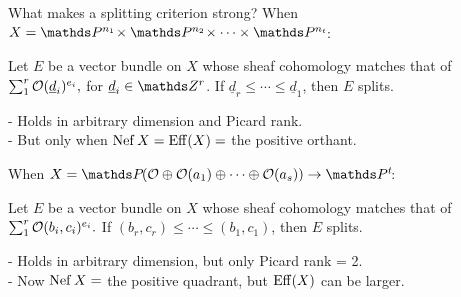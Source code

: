 \documentclass[beamer]{paper}
\begin{document}




\begin{frame}[t]{What makes a splitting criterion strong?}
  When $X = \PP{n_1}\times\PP{n_2}\times\cdots\times\PP{n_t}$:
  \begin{theorem}
    Let $E$ be a vector bundle on $X$ whose sheaf cohomology matches that of
    \( \sum_1^r \mathcal{O}(\underline{d}_i)^{e_i}, \) for $\underline{d}_i\in\ZZ^r$.
    {\color{rossred}If $\underline{d}_r \le \cdots \le \underline{d}_1$}, then $E$ splits.
  \end{theorem}
  \pause
  - Holds in arbitrary dimension and Picard rank. \\
  - But {\color{rossred}only when $\operatorname{Nef}X = \operatorname{Eff}(X) = $ the positive orthant}.

  \vfill
  \pause
  When $X = \PP{}(\o\oplus\o(a_1)\oplus\cdots\oplus\o(a_s)) \to \PP{t}$:
  \pause
  \begin{theorem}[Brown--S. '22]
    Let $E$ be a vector bundle on $X$ whose sheaf cohomology matches that of
    \( \sum_1^r \mathcal{O}(b_i, c_i)^{e_i}. \)
    {\color{rossred}If $(b_r, c_r) \le \cdots \le(b_1, c_1)$}, then $E$ splits.
  \end{theorem}
  \pause
  - Holds in arbitrary dimension, but {\color{rossred}only Picard rank = 2}. \\
  - Now $\operatorname{Nef}X = $ the positive quadrant, but {\color{rossgreen}$\operatorname{Eff}(X)$ can be larger}.
\end{frame}
\end{document}
